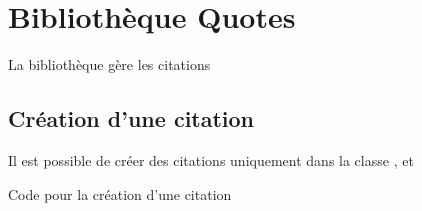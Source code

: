 
\chapter{Bibliothèque Quotes}

La bibliothèque  gère les citations

\section{Création d'une citation}

Il est possible de créer des citations uniquement dans la classe ,  et 


\begin{Latex}{Code pour la création d'une citation}
\end{Latex}

